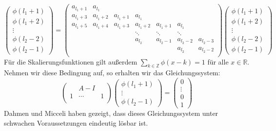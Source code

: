 \documentclass[11pt,a4paper,titlepage]{article}
\theoremstyle{plain} %
\theoremstyle{definition} %
\numberwithin{equation}{section} %
\begin{document}
	\begin{equation}
		\begin{pmatrix}
		\phi(l_1+1)\\
		\phi(l_1+2)\\
		\vdots	\\
		\phi(l_2-2)\\
		\phi(l_2-1)
		\end{pmatrix}
		=
		\begin{pmatrix}
		a_{l_1+1} & a_{l_1} &	&	&	& 		&\\
		a_{l_1+3} & a_{l_1+2} & a_{l_1+1} & a_{l_1} &	&	&\\
		a_{l_1+5}& a_{l_1+4} & a_{l_1+3} & a_{l_1+2} & a_{l_1+1} & a_{l_1} \\
		&	&	&	\ddots	&	\ddots	&	\ddots	&	\\
		&	&	&		a_{l_2} & a_{l_2-1} & a_{l_2-2} & a_{l_2-3}\\
		 &	&	&		 &  & a_{l_2} & a_{l_2-2}\\
		\end{pmatrix}	
		\begin{pmatrix}
		\phi(l_1+1)\\
		\phi(l_1+2)\\
		\vdots	\\
		\phi(l_2-2)\\
		\phi(l_2-1)
		\end{pmatrix}	
	\end{equation}
	Für die Skalierungsfunktionen gilt außerdem $\sum_{k\in \mathbb{Z}} \phi(x-k)=1 $ für alle $x \in \mathbb{R}$. Nehmen wir diese Bedingung auf, so erhalten wir das Gleichungssystem: 
	\begin{equation}
		\begin{pmatrix}
			&	A-I \\
			1 & \cdots & 1\\
		\end{pmatrix}
			\begin{pmatrix}
		\phi(l_1+1)\\
		\vdots	\\
		\phi(l_2-1)
		\end{pmatrix}
		=
		\begin{pmatrix}
		0\\
		\vdots\\
		0\\
		1
		\end{pmatrix}
	\end{equation}
	Dahmen und Micceli haben gezeigt, dass dieses Gleichungssystem unter schwachen Voraussetzungen eindeutig lösbar ist.\\
	
\end{document}
